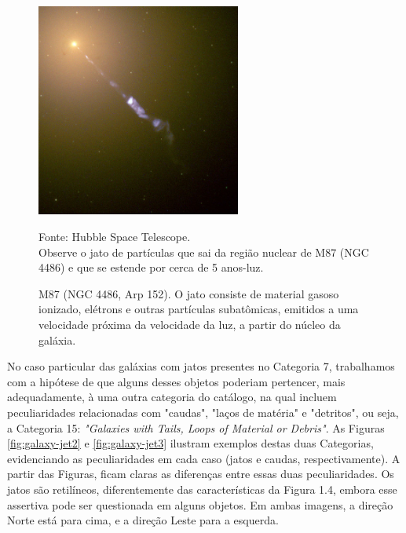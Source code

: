 \begin{figure}[!htb]
	\centering	
    \caption{M87 (NGC 4486, Arp 152). O jato consiste de material gasoso ionizado, elétrons e outras partículas subatômicas, emitidos a uma velocidade próxima da velocidade da luz, a partir do núcleo da galáxia.}
    \includegraphics[width=0.6\textwidth]{figuras/m87.jpg}
   	\begin{center}
        \normalsize Fonte: Hubble Space Telescope. \\Observe o jato de partículas que sai da região nuclear de M87 (NGC 4486) e que se estende por cerca de 5 anos-luz.
    \end{center}
	\label{fig:galxy-jet1}
\end{figure}

No caso particular das galáxias com jatos presentes no Categoria 7, trabalhamos com a hipótese de que alguns desses objetos poderiam pertencer, mais adequadamente, à uma outra categoria do catálogo, na qual incluem peculiaridades relacionadas com "caudas", "laços de matéria" e "detritos", ou seja, a Categoria 15: \textit{"Galaxies with Tails, Loops of Material or Debris"}. As Figuras \ref{fig:galaxy-jet2} e \ref{fig:galaxy-jet3} ilustram exemplos destas duas Categorias, evidenciando as peculiaridades em cada caso (jatos e caudas, respectivamente). A partir das Figuras, ficam claras as diferenças entre essas duas peculiaridades. Os jatos são retilíneos, diferentemente das características da Figura 1.4, embora esse assertiva pode ser questionada em alguns objetos. Em ambas imagens, a direção Norte está para cima, e a direção Leste para a esquerda.

